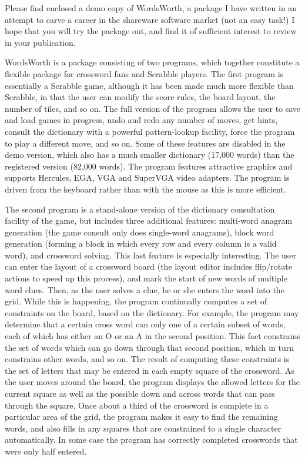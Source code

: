 
Please find enclosed a demo copy of WordsWorth, a package I have
written in an attempt to carve a career in the shareware software
market (not an easy task!) I hope that you will try the package
out, and find it of sufficient interest to review in your
publication.

WordsWorth is a package consisting of two programs, which together
constitute a flexible package for crossword fans and Scrabble players.
The first program is essentially a Scrabble game, although it has
been made much more flexible than Scrabble, in that the user can 
modify the score rules, the board layout, the number of tiles, and 
so on. The full version of the program allows the user to save and
load games in progress, undo and redo any number of moves, get
hints, consult the dictionary with a powerful pattern-lookup
facility, force the program to play a different move, and so on.
Some of these features are disabled in the demo version, which
also has a much smaller dictionary (17,000 words) than the 
registered version (82,000 words). The program features attractive
graphics and supports Hercules, EGA, VGA and SuperVGA video adapters.
The program is driven from the keyboard rather than with the mouse
as this is more efficient.

The second program is a stand-alone version of the dictionary
consultation facility of the game, but includes three additional
features: multi-word anagram generation (the game consult only
does single-word anagrams), block word generation (forming a block 
in which every row and every column is a valid word), and crossword
solving. This last feature is especially interesting. The user can
enter the layout of a crossword board (the layout editor includes
flip/rotate actions to speed up this process), and mark the start of
new words of multiple word clues. Then, as the user solves a clue,
he or she enters the word into the grid. While this is happening,
the program continually computes a set of constraints on the board,
based on the dictionary. For example, the program may determine that
a certain cross word can only one of a certain subset of words, 
each of which has either an O or an A in the second position. This
fact constrains the set of words which can go down through that
second position, which in turn constrains other words, and so on.
The result of computing these constraints is the set of letters
that may be entered in each empty square of the crossword. As the
user moves around the board, the program displays the allowed letters
for the current square as well as the possible down and across words
that can pass through the square. Once about a third of the crossword
is complete in a particular area of the grid, the program makes it 
easy to find the remaining words, and also fills in any squares that
are constrained to a single character automatically. In some case
the program has correctly completed crosswords that were only
half entered.

